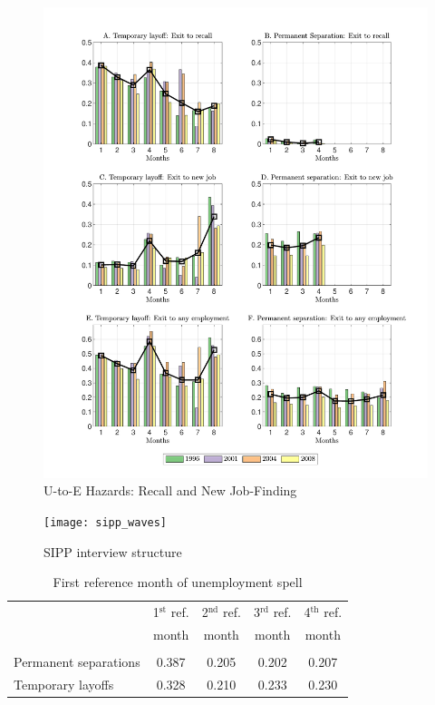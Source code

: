 \documentclass[12pt]{article}
\begin{document}
  \begin{figure}
    \caption{U-to-E Hazards: Recall and New Job-Finding\label{fig:UE}}
  \centerline{\includegraphics[width=1.00\linewidth]{./../figures/all}}
  \end{figure}

  \begin{figure}
  \caption{SIPP interview structure}
    \begin{center}
      \texttt{[image: sipp\_waves]}
    \end{center}
  \end{figure}

    \begin{table}
      \caption{First reference month of unemployment spell}
      \begin{center}
  \begin{tabular}{l|cccc}
    & \multicolumn{1}{c}{1$^\text{st}$ ref.}
    & \multicolumn{1}{c}{2$^\text{nd}$ ref.}
    & \multicolumn{1}{c}{3$^\text{rd}$ ref.}
    & \multicolumn{1}{c}{4$^\text{th}$ ref.} \\
    & \multicolumn{1}{c}{month}
    & \multicolumn{1}{c}{month}
    & \multicolumn{1}{c}{month}
    & \multicolumn{1}{c}{month} \\ \hline \\[-1em]
    Permanent separations & 0.387 &  0.205 &  
    0.202 &   0.207 \\[.35em]
    Temporary layoffs     & 0.328 &  0.210 &  0.233 &   0.230 \\[.35em]
    \hline
  \end{tabular}
      \end{center}
    \end{table}
\end{document}
